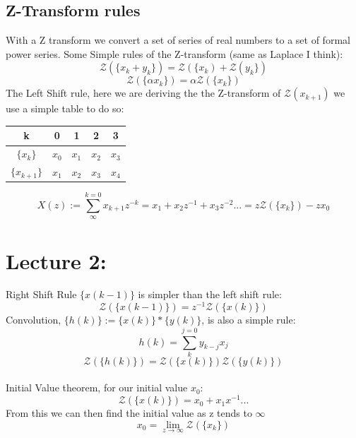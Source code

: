 \documentclass[a4paper,11pt]{article}
\begin{document}
	\subsection{Z-Transform rules}
		With a Z transform we convert a set of series of real numbers to a set of formal power series.
	Some Simple rules of the Z-transform (same as Laplace I think):
		\begin{equation}
		    \mathcal{Z}(\{x_{k}+y_{k}\}) = \mathcal{Z}(\{x_{k})+\mathcal{Z}(y_{k}\})
		\end{equation}
		\begin{equation}
		    \mathcal{Z}(\{\alpha x_{k}\}) = \alpha\mathcal{Z}(\{x_{k}\})
		\end{equation}
	The Left Shift rule, here we are deriving the the Z-transform of $\mathcal{Z}(x_{k+1})$ we use a simple table to do so:
	

	\begin{center}
	\begin{tabular}{ |c|c|c|c|c| } 
	 \hline
	 k & 0 & 1 &2&3\\ 
	 \hline
	 $\{x_{k}\}$& $x_{0}$ & $x_{1}$& $x_{2}$& $x_{3}$\\ 
	\hline	 
	 $\{x_{k+1}\}$& $x_{1}$& $x_{2}$& $x_{3}$& $x_{4}$\\ 
	 \hline
	\end{tabular}
	\end{center}
	\begin{equation}
		X(z):= \sum\limits_{\infty}^{k=0}x_{k+1}z^{-k}=	x_{1} + x_{2}z^{-1} +x_{3}z^{-2}...= z\mathcal{Z}(\{x_k\})-zx_0
	\end{equation}
\section{Lecture 2:}
	Right Shift Rule $\{x(k-1)\}$ is simpler than the left shift rule:
	\begin{equation}
		\mathcal{Z}(\{x(k-1)\})=z^{-1}\mathcal{Z}(\{x(k)\})
	\end{equation}
	Convolution, $\{h(k)\}:=\{x(k)\}*\{y(k)\}$, is also a simple rule:
	\begin{equation}
		h(k) = \sum\limits_{k}^{j=0}y_{k-j}x_j
	\end{equation}
	\begin{equation}
		\mathcal{Z}(\{h(k)\})=\mathcal{Z}(\{x(k)\})\mathcal{Z}(\{y(k)\})
	\end{equation}\\
	Initial Value theorem, for our initial value $x_0$:
	\begin{equation}
		\mathcal{Z}(\{x(k)\})=x_0+x_1x^{-1}...
	\end{equation}
	From this we can then find the initial value as z tends to $\infty$ 
	\begin{equation}
		x_0=\lim\limits_{z \rightarrow \infty}\mathcal{Z}(\{x_k\})
	\end{equation}
\end{document}
